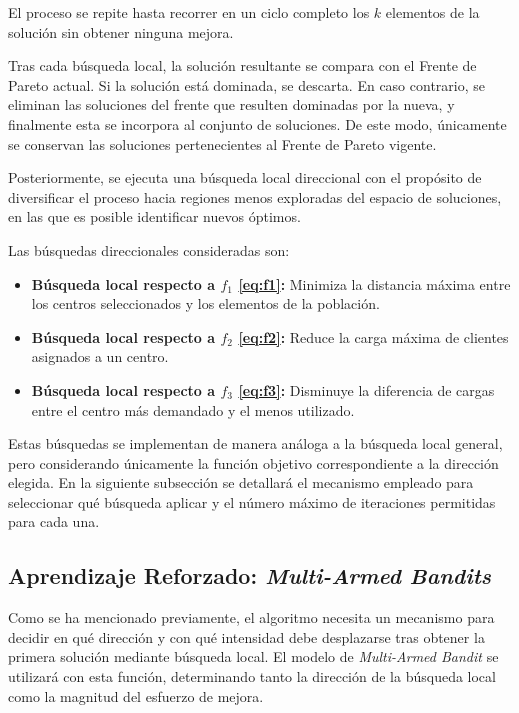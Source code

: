 \documentclass[12pt,a4paper]{book}
\begin{document}
El proceso se repite hasta recorrer en un ciclo completo los $k$ elementos de la solución sin obtener ninguna mejora.

Tras cada búsqueda local, la solución resultante se compara con el Frente de Pareto actual. Si la solución está dominada, se descarta. En caso contrario, se eliminan las soluciones del frente que resulten dominadas por la nueva, y finalmente esta se incorpora al conjunto de soluciones. De este modo, únicamente se conservan las soluciones pertenecientes al Frente de Pareto vigente.

Posteriormente, se ejecuta una búsqueda local direccional con el propósito de diversificar el proceso hacia regiones menos exploradas del espacio de soluciones, en las que es posible identificar nuevos óptimos.  

Las búsquedas direccionales consideradas son:  

\begin{itemize}
    \item \textbf{Búsqueda local respecto a $f_1$ \ref{eq:f1}:} Minimiza la distancia máxima entre los centros seleccionados y los elementos de la población.
    \item \textbf{Búsqueda local respecto a $f_2$ \ref{eq:f2}:} Reduce la carga máxima de clientes asignados a un centro.
    \item \textbf{Búsqueda local respecto a $f_3$ \ref{eq:f3}:} Disminuye la diferencia de cargas entre el centro más demandado y el menos utilizado.
\end{itemize}

Estas búsquedas se implementan de manera análoga a la búsqueda local general, pero considerando únicamente la función objetivo correspondiente a la dirección elegida. En la siguiente subsección se detallará el mecanismo empleado para seleccionar qué búsqueda aplicar y el número máximo de iteraciones permitidas para cada una.

\subsection{Aprendizaje Reforzado: \textit{Multi-Armed Bandits}}
Como se ha mencionado previamente, el algoritmo necesita un mecanismo para decidir en qué dirección y con qué intensidad debe desplazarse tras obtener la primera solución mediante búsqueda local. El modelo de \textit{Multi-Armed Bandit} se utilizará con esta función, determinando tanto la dirección de la búsqueda local como la magnitud del esfuerzo de mejora.
\end{document}

